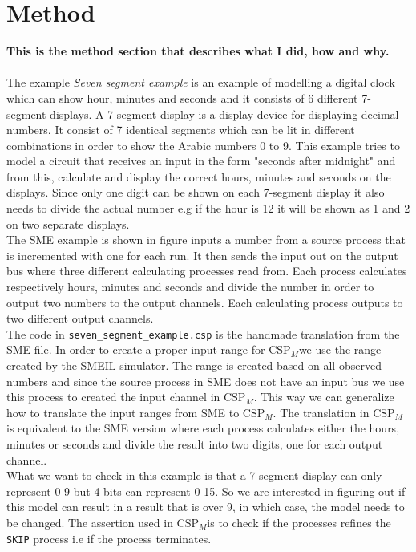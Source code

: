 \documentclass[a4paper]{report}
\newcommand{\cspm}{CSP$_M$}
\begin{document}
\chapter{Method}
\textbf{This is the method section that describes what I did, how and why.}
\\\\
The example \textit{Seven segment example} is an example of modelling a digital clock which can show hour, minutes and seconds and it consists of 6 different 7-segment displays. A 7-segment display is a display device for displaying decimal numbers. It consist of 7 identical segments which can be lit in different combinations in order to show the Arabic numbers 0 to 9.  This example tries to model a circuit that receives an input in the form "seconds after midnight" and from this, calculate and display the correct hours, minutes and seconds on the displays. Since only one digit can be shown on each 7-segment display it also needs to divide the actual number e.g if the hour is 12 it will be shown as 1 and 2 on two separate displays. \\ The SME example is shown in figure  inputs a number from a source process that is incremented with one for each run. It then sends the input out on the output bus where three different calculating processes read from. Each process calculates respectively hours, minutes and seconds and divide the number in order to output two numbers to the output channels. Each calculating process outputs to two different output channels. \\ The code in \texttt{seven\_segment\_example.csp} is the handmade translation from the SME file. In order to create a proper input range for \cspm we use the range created by the SMEIL simulator. The range is created based on all observed numbers and since the source process in SME does not have an input bus we use this process to created the input channel in \cspm. This way we can generalize how to translate the input ranges from SME to \cspm. The translation in \cspm is equivalent to the SME version where each process calculates either the hours, minutes or seconds and divide the result into two digits, one for each output channel.\\ What we want to check in this example is that a 7 segment display can only represent 0-9 but 4 bits can represent 0-15. So we are interested in figuring out if this model can result in a result that is over 9, in which case, the model needs to be changed. The assertion used in \cspm is to check if the processes refines the \texttt{SKIP} process i.e if the process terminates. 
\end{document}
